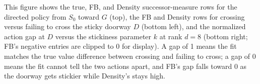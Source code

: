 This figure shows the true, FB, and Density successor-measure rows for the directed policy from $S_0$ toward $G$ (top), the FB and Density rows for crossing versus failing to cross the sticky doorway $D$ (bottom left), and the normalized action gap at $D$ versus the stickiness parameter $k$ at rank $d=8$ (bottom right; FB's negative entries are clipped to 0 for display). A gap of 1 means the fit matches the true value difference between crossing and failing to cross; a gap of 0 means the fit cannot tell the two actions apart, and FB's gap falls toward 0 as the doorway gets stickier while Density's stays high.

